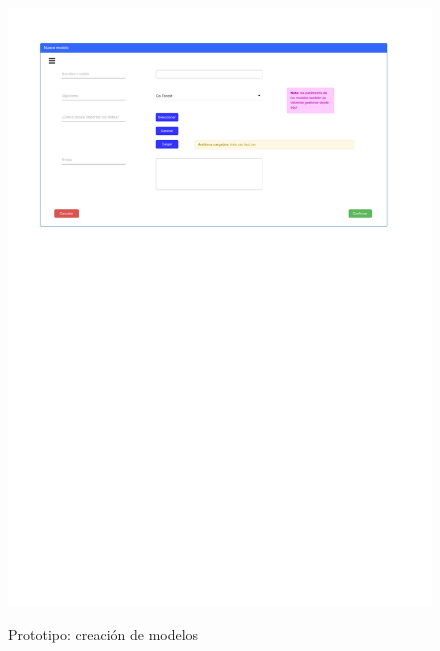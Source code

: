 \begin{figure}[h]
	\caption{Prototipo: creación de modelos}
	\centering
	\includegraphics[width=\textwidth]{../img/anexos/mockups/6-mockups-new_model}
	\label{mock:model-new}
\end{figure}

